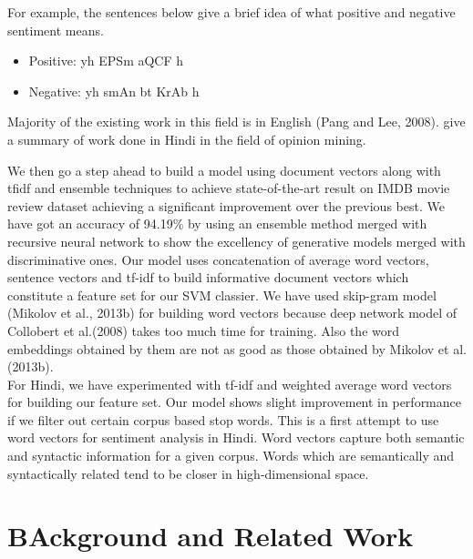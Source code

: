 \documentclass[11pt,a4paper]{article}
\begin{document}
For example, the sentences below give a brief idea of what positive and negative sentiment means.
\begin{itemize}
\item Positive: {\dn yh EPSm aQCF h\4}
\item Negative: {\dn yh smAn bt KrAb h\4}
\end{itemize}
Majority of the existing work in this field is in English (Pang and Lee, 2008). \cite{Sharma:14} give a summary of work done in Hindi in the field of opinion mining.

We then go a step ahead to build a model using document vectors along with tfidf and ensemble techniques to achieve state-of-the-art result on IMDB movie review dataset achieving a significant improvement over the previous best. We have got an accuracy of 94.19\% by using an ensemble method merged with recursive neural network to show the excellency of generative models merged with discriminative ones.
Our model uses concatenation of average word vectors, sentence vectors and tf-idf to build informative document vectors which constitute a feature set for our SVM classier. We have used skip-gram model (Mikolov et al., 2013b) for building word vectors because deep network model of Collobert et al.(2008) takes too much time for training. Also the word embeddings obtained by them are not as good as those obtained by Mikolov et al.(2013b). \\
For Hindi, we have experimented with tf-idf and weighted average word vectors for building our feature set. Our model shows slight improvement in performance if we filter out certain corpus based stop words. This is a first attempt to use word vectors for sentiment analysis in Hindi. Word vectors capture both semantic and syntactic information for a given corpus. Words which are semantically and syntactically related tend to be closer in high-dimensional space.\\

\section{BAckground and Related Work}
\end{document}
